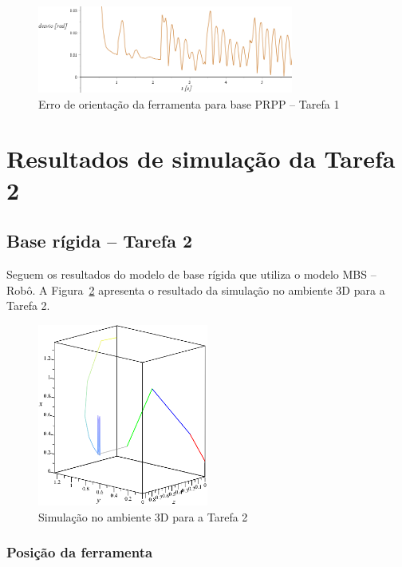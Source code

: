 \begin{figure}[h!]
	\centering 
 	\includegraphics[width=0.75\textwidth]{figs/t1_erroori_base_prpp}
 	\caption{Erro de orientação da ferramenta para base PRPP -- Tarefa
 	1}
 	\label{fig::t1_erroori_base_prpp}
\end{figure}



\clearpage
\section{Resultados de simulação da Tarefa 2} \label{sec::resultados_t2}

\subsection{Base rígida -- Tarefa 2}

Seguem os resultados do modelo de base rígida que utiliza o modelo MBS --
Robô.
A Figura~\ref{fig::t2_anima3D_base_rig} apresenta o resultado da simulação no ambiente
3D para a Tarefa 2.

\begin{figure}[h!]
	\centering 
 	\includegraphics[width=0.50\textwidth]{figs/t2_anima3D_base_rig}
 	\caption{Simulação no ambiente 3D para a Tarefa 2}
 	\label{fig::t2_anima3D_base_rig}
\end{figure}


\subsubsection{Posição da ferramenta}

